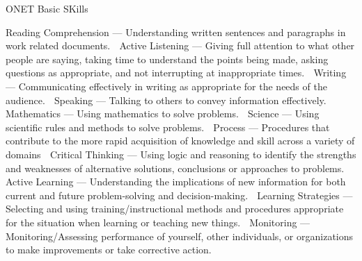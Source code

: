

 ONET Basic SKills
 
 Reading Comprehension — Understanding written sentences and paragraphs in
work related documents.
 Active Listening — Giving full attention to what other people are saying, taking
time to understand the points being made, asking questions as appropriate, and not
interrupting at inappropriate times.
 Writing — Communicating effectively in writing as appropriate for the needs of
the audience.
 Speaking — Talking to others to convey information effectively.
 Mathematics — Using mathematics to solve problems.
 Science — Using scientific rules and methods to solve problems.
 Process — Procedures that contribute to the more rapid acquisition of knowledge and
skill across a variety of domains
 Critical Thinking — Using logic and reasoning to identify the strengths and
weaknesses of alternative solutions, conclusions or approaches to problems.
 Active Learning — Understanding the implications of new information for both
current and future problem-solving and decision-making.
 Learning Strategies — Selecting and using training/instructional methods and
procedures appropriate for the situation when learning or teaching new things.
 Monitoring — Monitoring/Assessing performance of yourself, other individuals,
or organizations to make improvements or take corrective action.